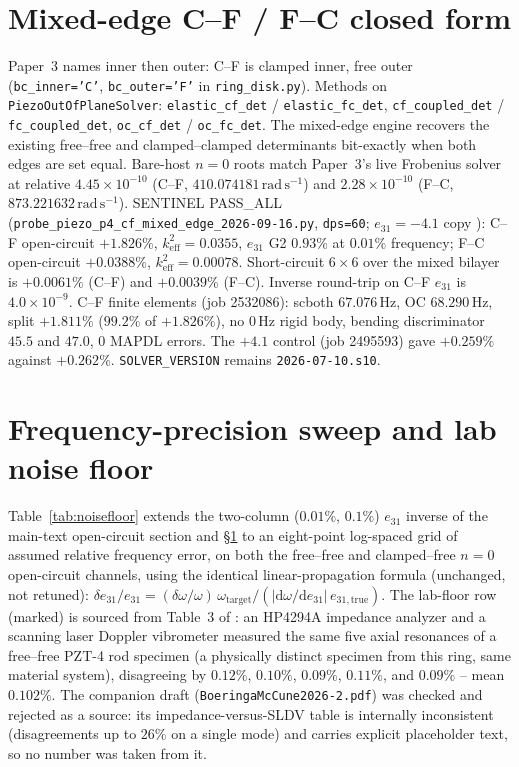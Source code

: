 \documentclass[11pt]{article}
\newcommand{\fn}[1]{\texttt{\seqsplit{#1}}}
\begin{document}
\section{Mixed-edge C--F / F--C closed form}
\label{sec:scf}
Paper~3 names inner then outer: C--F is clamped inner, free outer
(\texttt{bc\_inner='C'}, \texttt{bc\_outer='F'} in
\texttt{ring\_disk.py}). Methods on
\texttt{PiezoOutOfPlaneSolver}: \texttt{elastic\_cf\_det} /
\texttt{elastic\_fc\_det}, \texttt{cf\_coupled\_det} /
\texttt{fc\_coupled\_det}, \texttt{oc\_cf\_det} /
\texttt{oc\_fc\_det}. The mixed-edge engine recovers the existing
free--free and clamped--clamped determinants bit-exactly when both
edges are set equal. Bare-host $n=0$ roots match Paper~3's live
Frobenius solver at relative $4.45\times10^{-10}$ (C--F,
$410.074181\,\mathrm{rad\,s^{-1}}$) and $2.28\times10^{-10}$ (F--C,
$873.221632\,\mathrm{rad\,s^{-1}}$). SENTINEL PASS\_ALL
(\texttt{probe\_piezo\_p4\_cf\_mixed\_edge\_2026-09-16.py},
\texttt{dps=60}; $e_{31}=-4.1$ copy
\fn{probe\_piezo\_p4\_cf\_mixed\_edge\_e31m\_2026-09-24.py}): C--F
open-circuit $+1.826\%$, $k_{\mathrm{eff}}^2=0.0355$, $e_{31}$ G2
$0.93\%$ at $0.01\%$ frequency; F--C open-circuit $+0.0388\%$,
$k_{\mathrm{eff}}^2=0.00078$. Short-circuit $6\times6$ over the mixed
bilayer is $+0.0061\%$ (C--F) and $+0.0039\%$ (F--C). Inverse round-trip
on C--F $e_{31}$ is $4.0\times10^{-9}$. C--F finite elements (job
2532086): scboth $67.076\,\mathrm{Hz}$, OC $68.290\,\mathrm{Hz}$, split
$+1.811\%$ ($99.2\%$ of $+1.826\%$), no $0\,\mathrm{Hz}$ rigid body,
bending discriminator $45.5$ and $47.0$, 0 MAPDL errors. The $+4.1$
control (job 2495593) gave $+0.259\%$ against $+0.262\%$.
\texttt{SOLVER\_VERSION} remains \texttt{2026-07-10.s10}.

\section{Frequency-precision sweep and lab noise floor}
\label{sec:noisefloor}
Table~\ref{tab:noisefloor} extends the two-column ($0.01\%$, $0.1\%$)
$e_{31}$ inverse of the main-text open-circuit section and \S\ref{sec:scf} to an eight-point
log-spaced grid of assumed relative frequency error, on both the
free--free and clamped--free $n=0$ open-circuit channels, using the
identical linear-propagation formula (unchanged, not retuned):
$\delta e_{31}/e_{31}=(\delta\omega/\omega)\,\omega_{\mathrm{target}}
/(|\mathrm{d}\omega/\mathrm{d}e_{31}|\,e_{31,\mathrm{true}})$. The
lab-floor row (marked) is sourced from Table~3 of
\cite{boeringa2026}: an HP4294A impedance analyzer and a scanning
laser Doppler vibrometer measured the same five axial resonances of a
free--free PZT-4 rod specimen (a physically distinct specimen from
this ring, same material system), disagreeing by $0.12\%$,
$0.10\%$, $0.09\%$, $0.11\%$, and $0.09\%$ -- mean $0.102\%$. The
companion draft (\texttt{BoeringaMcCune2026-2.pdf}) was checked and
rejected as a source: its impedance-versus-SLDV table is internally
inconsistent (disagreements up to $26\%$ on a single mode) and
carries explicit placeholder text, so no number was taken from it.
\end{document}
